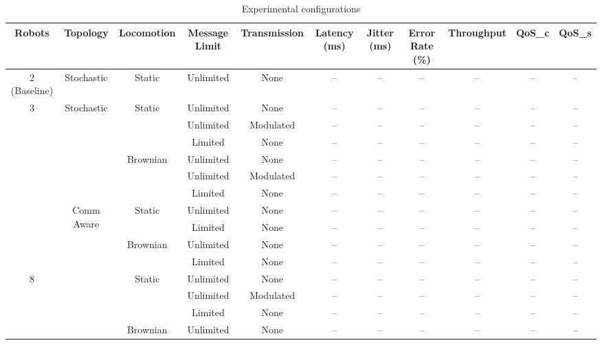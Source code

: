 \documentclass[conference]{IEEEtran}
\begin{document}
\renewcommand{\arraystretch}{0.9}  
\begin{table}[ht]
\scriptsize
\centering
\caption{Experimental configurations}
\label{tab:exp_config}
\begin{tabular}{c|c|c|c|c|c|c|c|c|c|c}
\toprule
\textbf{Robots} & \textbf{Topology} & \textbf{Locomotion} & \textbf{Message Limit} & \textbf{Transmission} & \textbf{Latency (ms)} & \textbf{Jitter (ms)} & \textbf{Error Rate (\%)} & \textbf{Throughput} & \textbf{QoS\_c} & \textbf{QoS\_s} \\
\midrule
2 (Baseline) & Stochastic & Static & Unlimited & None & -- & -- & -- & -- & -- & -- \\
\midrule
\multirow{10}{*}{3}
  & \multirow{5}{*}{Stochastic}
    & \multirow{2}{*}{Static}
                 & Unlimited & None      & -- & -- & -- & -- & -- & -- \\
  &   &          & Unlimited & Modulated & -- & -- & -- & -- & -- & -- \\
  &   &          & Limited   & None      & -- & -- & -- & -- & -- & -- \\
  \cmidrule{3-11}
  &   & \multirow{2}{*}{Brownian}
                 & Unlimited & None      & -- & -- & -- & -- & -- & -- \\
  &   &          & Unlimited & Modulated & -- & -- & -- & -- & -- & -- \\
  &   &          & Limited   & None      & -- & -- & -- & -- & -- & -- \\
  \cmidrule{2-11}
  & \multirow{5}{*}{Comm Aware}
    & \multirow{2}{*}{Static}
                 & Unlimited & None      & -- & -- & -- & -- & -- & -- \\
  &   &          & Limited   & None      & -- & -- & -- & -- & -- & -- \\
  \cmidrule{3-11}
  &   & \multirow{2}{*}{Brownian}
                 & Unlimited & None      & -- & -- & -- & -- & -- & -- \\
  &   &          & Limited   & None      & -- & -- & -- & -- & -- & -- \\
\midrule
\multirow{10}{*}{8}
  & \multirow{5}{*}{Stochastic}
    & \multirow{2}{*}{Static}
                 & Unlimited & None      & -- & -- & -- & -- & -- & -- \\
  &   &          & Unlimited & Modulated & -- & -- & -- & -- & -- & -- \\
  &   &          & Limited   & None      & -- & -- & -- & -- & -- & -- \\
  \cmidrule{3-11}
  &   & \multirow{2}{*}{Brownian}
                 & Unlimited & None      & -- & -- & -- & -- & -- & -- \\

\end{tabular}
\end{table}
\end{document}
